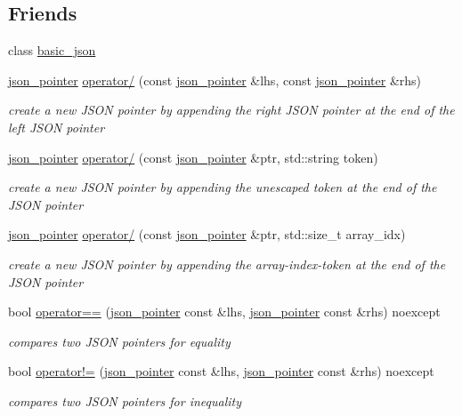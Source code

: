 \subsection*{Friends}
\begin{DoxyCompactItemize}
\item 
class \hyperlink{classnlohmann_1_1json__pointer_ada3100cdb8700566051828f1355fa745}{basic\+\_\+json}
\item 
\hyperlink{classnlohmann_1_1json__pointer}{json\+\_\+pointer} \hyperlink{classnlohmann_1_1json__pointer_a90a11fe6c7f37b1746a3ff9cb24b0d53}{operator/} (const \hyperlink{classnlohmann_1_1json__pointer}{json\+\_\+pointer} \&lhs, const \hyperlink{classnlohmann_1_1json__pointer}{json\+\_\+pointer} \&rhs)
\begin{DoxyCompactList}\small\item\em create a new J\+S\+ON pointer by appending the right J\+S\+ON pointer at the end of the left J\+S\+ON pointer \end{DoxyCompactList}\item 
\hyperlink{classnlohmann_1_1json__pointer}{json\+\_\+pointer} \hyperlink{classnlohmann_1_1json__pointer_a926c9065dbed1bedc17857a813f7a46f}{operator/} (const \hyperlink{classnlohmann_1_1json__pointer}{json\+\_\+pointer} \&ptr, std\+::string token)
\begin{DoxyCompactList}\small\item\em create a new J\+S\+ON pointer by appending the unescaped token at the end of the J\+S\+ON pointer \end{DoxyCompactList}\item 
\hyperlink{classnlohmann_1_1json__pointer}{json\+\_\+pointer} \hyperlink{classnlohmann_1_1json__pointer_af5a4bc4f82113c271c9a0cd4d3b5f31c}{operator/} (const \hyperlink{classnlohmann_1_1json__pointer}{json\+\_\+pointer} \&ptr, std\+::size\+\_\+t array\+\_\+idx)
\begin{DoxyCompactList}\small\item\em create a new J\+S\+ON pointer by appending the array-\/index-\/token at the end of the J\+S\+ON pointer \end{DoxyCompactList}\item 
bool \hyperlink{classnlohmann_1_1json__pointer_a4667ef558c8c3f8a646bfda0c6654653}{operator==} (\hyperlink{classnlohmann_1_1json__pointer}{json\+\_\+pointer} const \&lhs, \hyperlink{classnlohmann_1_1json__pointer}{json\+\_\+pointer} const \&rhs) noexcept
\begin{DoxyCompactList}\small\item\em compares two J\+S\+ON pointers for equality \end{DoxyCompactList}\item 
bool \hyperlink{classnlohmann_1_1json__pointer_a6779edcf28e6f018a3bbb29c0b4b5e1e}{operator!=} (\hyperlink{classnlohmann_1_1json__pointer}{json\+\_\+pointer} const \&lhs, \hyperlink{classnlohmann_1_1json__pointer}{json\+\_\+pointer} const \&rhs) noexcept
\begin{DoxyCompactList}\small\item\em compares two J\+S\+ON pointers for inequality \end{DoxyCompactList}\end{DoxyCompactItemize}



